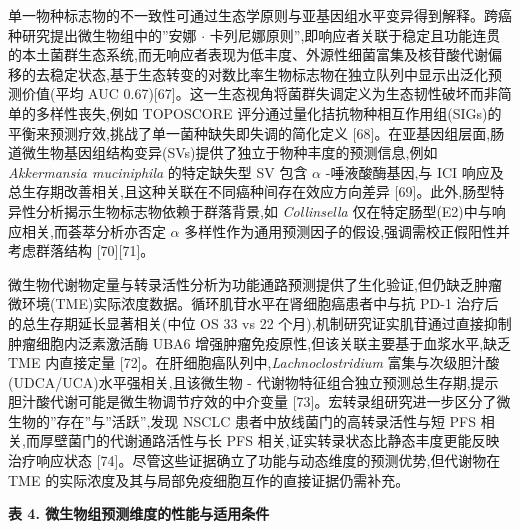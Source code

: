 单一物种标志物的不一致性可通过生态学原则与亚基因组水平变异得到解释。跨癌种研究提出微生物组中的''安娜 \(\cdot\) 卡列尼娜原则'',即响应者关联于稳定且功能连贯的本土菌群生态系统,而无响应者表现为低丰度、外源性细菌富集及核苷酸代谢偏移的去稳定状态,基于生态转变的对数比率生物标志物在独立队列中显示出泛化预测价值(平均 AUC 0.67){[}67{]}。这一生态视角将菌群失调定义为生态韧性破坏而非简单的多样性丧失,例如 TOPOSCORE 评分通过量化拮抗物种相互作用组(SIGs)的平衡来预测疗效,挑战了单一菌种缺失即失调的简化定义 {[}68{]}。在亚基因组层面,肠道微生物基因组结构变异(SVs)提供了独立于物种丰度的预测信息,例如 \emph{Akkermansia muciniphila} 的特定缺失型 SV 包含 \(\alpha\) -唾液酸酶基因,与 ICI 响应及总生存期改善相关,且这种关联在不同癌种间存在效应方向差异 {[}69{]}。此外,肠型特异性分析揭示生物标志物依赖于群落背景,如 \emph{Collinsella} 仅在特定肠型(E2)中与响应相关,而荟萃分析亦否定 \(\alpha\) 多样性作为通用预测因子的假设,强调需校正假阳性并考虑群落结构 {[}70{]}{[}71{]}。

微生物代谢物定量与转录活性分析为功能通路预测提供了生化验证,但仍缺乏肿瘤微环境(TME)实际浓度数据。循环肌苷水平在肾细胞癌患者中与抗 PD-1 治疗后的总生存期延长显著相关(中位 OS 33 vs 22 个月),机制研究证实肌苷通过直接抑制肿瘤细胞内泛素激活酶 UBA6 增强肿瘤免疫原性,但该关联主要基于血浆水平,缺乏 TME 内直接定量 {[}72{]}。在肝细胞癌队列中,\emph{Lachnoclostridium} 富集与次级胆汁酸(UDCA/UCA)水平强相关,且该微生物 - 代谢物特征组合独立预测总生存期,提示胆汁酸代谢可能是微生物调节疗效的中介变量 {[}73{]}。宏转录组研究进一步区分了微生物的''存在''与''活跃'',发现 NSCLC 患者中放线菌门的高转录活性与短 PFS 相关,而厚壁菌门的代谢通路活性与长 PFS 相关,证实转录状态比静态丰度更能反映治疗响应状态 {[}74{]}。尽管这些证据确立了功能与动态维度的预测优势,但代谢物在 TME 的实际浓度及其与局部免疫细胞互作的直接证据仍需补充。

\textbf{表 4. 微生物组预测维度的性能与适用条件}

